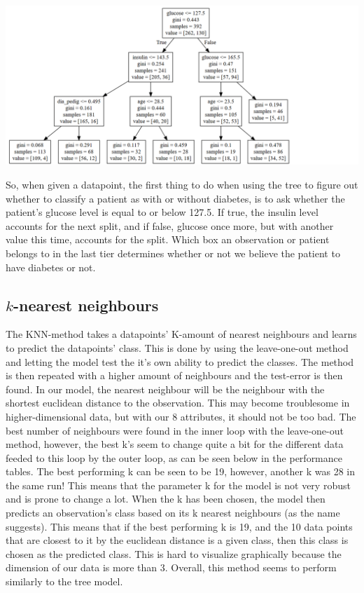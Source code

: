 \includegraphics[width=\textwidth]{tree.png}

So, when given a datapoint, the first thing to do when using the tree to figure
out whether to classify a patient as with or without diabetes, is to ask whether
the patient's glucose level is equal to or below 127.5. If true, the insulin level
accounts for the next split, and if false, glucose once more, but with another
value this time, accounts for the split. Which box an observation or patient belongs
to in the last tier determines whether or not we believe the patient to have diabetes
or not.

\subsection{$k$-nearest neighbours}
The KNN-method takes a datapoints' K-amount of nearest neighbours and learns to predict the datapoints' class.
This is done by using the leave-one-out method and letting the model test the it's own ability to predict the classes.
The method is then repeated with a higher amount of neighbours and the test-error is then found. In our model, the nearest
neighbour will be the neighbour with the shortest euclidean distance to the observation.
This may become troublesome in higher-dimensional data, but with our 8 attributes, it should
not be too bad. The best number of neighbours were found in the inner loop with
the leave-one-out method, however, the best k's seem to change quite a bit for the
different data feeded to this loop by the outer loop, as can be seen below in the performance
tables. The best performing k can be seen to be 19, however, another k was
28 in the same run! This means that the parameter k for the model is not very
robust and is prone to change a lot. When the k has been chosen, the model then
predicts an observation's class based on its k nearest neighbours (as the
name suggests). This means that if the best performing k is 19, and the 10
data points that are closest to it by the euclidean distance is a given class,
then this class is chosen as the predicted class. This is hard to visualize
graphically because the dimension of our data is more than 3. Overall, this
method seems to perform similarly to the tree model.


